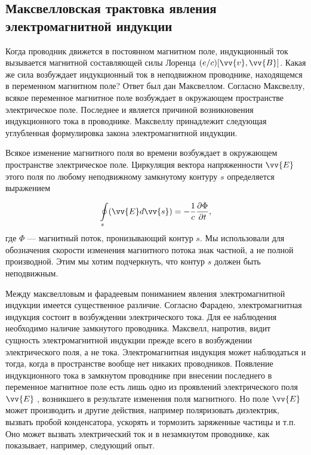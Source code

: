 \subsection{Максвелловская трактовка
явления электромагнитной индукции}
Когда проводник движется в
постоянном магнитном поле, индукционный
ток вызывается магнитной составляющей
силы Лоренца $(e/c)[\vv{v},\vv{B}]$. Какая же сила
возбуждает индукционный ток в
неподвижном проводнике, находящемся в
переменном магнитном поле? Ответ был дан
Максвеллом. Согласно Максвеллу, всякое
переменное магнитное поле возбуждает в
окружающем пространстве электрическое
поле. Последнее и является причиной
возникновения индукционного тока в
проводнике. Максвеллу принадлежит
следующая углубленная формулировка
закона электромагнитной индукции.

Всякое изменение магнитного поля во
времени возбуждает в окружающем
пространстве электрическое поле.
Циркуляция вектора напряженности $\vv{E}$ этого
поля по любому неподвижному замкнутому
контуру $s$ определяется выражением

\begin{equation}
    \oint\limits_s (\vv{E} d\vv{s}) =
    - \frac{1}{c}
    \frac{\partial\Phi}{\partial t},
    \label{eq:maxvel}
\end{equation}
где $\Phi$ --- магнитный поток,
пронизывающий контур $s$. Мы
использовали для обозначения скорости
изменения магнитного потока знак
частной, а не полной производной. Этим
мы хотим подчеркнуть, что контур $s$  
должен быть неподвижным.

Между максвелловым и фарадеевым
пониманием явления электромагнитной
индукции имеется существенное различие.
Согласно Фарадею, электромагнитная
индукция состоит в возбуждении
электрического тока. Для ее наблюдения
необходимо наличие замкнутого
проводника. Максвелл, напротив, видит
сущность электромагнитной индукции
прежде всего в возбуждении
электрического поля, а не тока.
Электромагнитная индукция может
наблюдаться и тогда, когда в
пространстве вообще нет никаких
проводников. Появление индукционного
тока в замкнутом проводнике при внесении
последнего в переменное магнитное поле
есть лишь одно из проявлений
электрического поля $\vv{E}$ , возникшего в
результате изменения поля магнитного. Но
поле $\vv{E}$ может производить и другие
действия, например поляризовать
диэлектрик, вызвать пробой конденсатора,
ускорять и тормозить заряженные частицы
и т.п. Оно может вызвать электрический
ток и в незамкнутом проводнике, как
показывает, например, следующий опыт.

